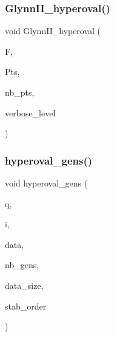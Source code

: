 \mbox{\label{data_8_c_a7441fa50c10edf9ce1e898ca66ca55cb}} 
\subsubsection{\texorpdfstring{Glynn\+I\+I\+\_\+hyperoval()}{GlynnII\_hyperoval()}}
{\footnotesize\ttfamily void Glynn\+I\+I\+\_\+hyperoval (\begin{DoxyParamCaption}\item[{\mbox{\hyperlink{classfinite__field}{finite\+\_\+field}} $\ast$}]{F,  }\item[{\mbox{\hyperlink{galois_8h_a09fddde158a3a20bd2dcadb609de11dc}{I\+NT}} $\ast$\&}]{Pts,  }\item[{\mbox{\hyperlink{galois_8h_a09fddde158a3a20bd2dcadb609de11dc}{I\+NT}} \&}]{nb\+\_\+pts,  }\item[{\mbox{\hyperlink{galois_8h_a09fddde158a3a20bd2dcadb609de11dc}{I\+NT}}}]{verbose\+\_\+level }\end{DoxyParamCaption})}

\mbox{\label{data_8_c_a99efca698f8dba1f4702d1ac011fb3b4}} 
\subsubsection{\texorpdfstring{hyperoval\+\_\+gens()}{hyperoval\_gens()}}
{\footnotesize\ttfamily void hyperoval\+\_\+gens (\begin{DoxyParamCaption}\item[{\mbox{\hyperlink{galois_8h_a09fddde158a3a20bd2dcadb609de11dc}{I\+NT}}}]{q,  }\item[{\mbox{\hyperlink{galois_8h_a09fddde158a3a20bd2dcadb609de11dc}{I\+NT}}}]{i,  }\item[{\mbox{\hyperlink{galois_8h_a09fddde158a3a20bd2dcadb609de11dc}{I\+NT}} $\ast$\&}]{data,  }\item[{\mbox{\hyperlink{galois_8h_a09fddde158a3a20bd2dcadb609de11dc}{I\+NT}} \&}]{nb\+\_\+gens,  }\item[{\mbox{\hyperlink{galois_8h_a09fddde158a3a20bd2dcadb609de11dc}{I\+NT}} \&}]{data\+\_\+size,  }\item[{const \mbox{\hyperlink{galois_8h_ab6cc7b4aeb6ea31aba2b3fbfc83ff5e6}{B\+Y\+TE}} $\ast$\&}]{stab\+\_\+order }\end{DoxyParamCaption})}

